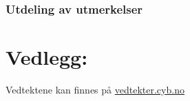 \documentclass[10pt,norsk,a4paper,usenames,dvipsnames]{article}
\begin{document}
\section{Utdeling av utmerkelser}



\part*{Vedlegg:}\label{lastpage}

    \centering\huge Vedtektene kan finnes på \href{vedtekter.cyb.no}{vedtekter.cyb.no}
    

% 
\end{document}
